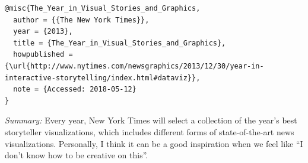 \documentclass[]{book}
\theoremstyle{definition}
\theoremstyle{definition}
\theoremstyle{definition}
\theoremstyle{remark}
\begin{document}
\begin{verbatim}
@misc{The_Year_in_Visual_Stories_and_Graphics,
  author = {{The New York Times}},
  year = {2013},
  title = {The_Year_in_Visual_Stories_and_Graphics},
  howpublished = {\url{http://www.nytimes.com/newsgraphics/2013/12/30/year-in-interactive-storytelling/index.html#dataviz}},
  note = {Accessed: 2018-05-12}
}
\end{verbatim}

\emph{Summary: }Every year, New York Times will select a collection of
the year's best storyteller visualizations, which includes different
forms of state-of-the-art news visualizations. Personally, I think it
can be a good inspiration when we feel like ``I don't know how to be
creative on this''.


\end{document}
